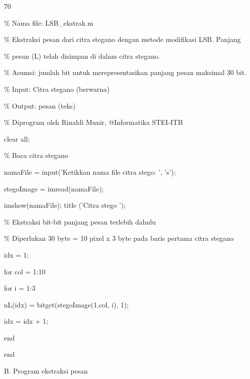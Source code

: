 \documentclass{article}
\begin{document}

70

\% Nama file: LSB\_ekstrak.m

\% Ekstraksi pesan dari citra stegano dengan metode modifikasi LSB. Panjang

\% pesan (L) telah disimpan di dalam citra stegano. 

\% Asumsi: jumlah bit untuk merepresentasikan panjang pesan maksimal 30 bit.

\% Input: Citra stegano (berwarna)

\% Output: pesan (teks)

\% Diprogram oleh Rinaldi Munir, @Informatika STEI-ITB


clear all;


\% Baca citra stegano

namaFile = input('Ketikkan nama file citra stego: ', 's');

stegoImage = imread(namaFile);

imshow(namaFile); title ('Citra stego ');


\% Ekstraksi bit-bit panjang pesan terlebih dahulu 

\% Diperlukan 30 byte = 10 pixel x 3 byte pada baris pertama citra stegano

idx = 1;

for col = 1:10

    for i = 1:3

        nL(idx) = bitget(stegoImage(1,col, i), 1);

        idx = idx + 1;

    end    

end

B. Program ekstraksi pesan
\end{document}
